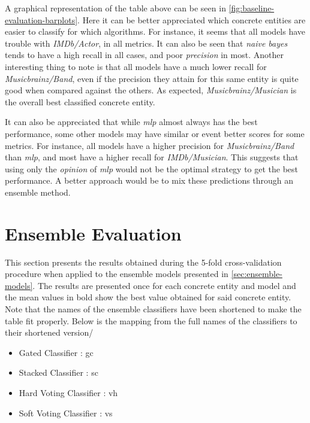 \documentclass[epsfig,a4paper,11pt,titlepage,twoside,openany]{book}
\begin{document}
A graphical representation of the table above can be seen in \autoref{fig:baseline-evaluation-barplots}. Here it can be better appreciated which concrete entities are easier to classify for which algorithms. For instance, it seems that all models have trouble with \textit{IMDb/Actor}, in all metrics. It can also be seen that \textit{naive bayes} tends to have a high recall in all cases, and poor \textit{precision} in most. Another interesting thing to note is that all models have a much lower recall for \textit{Musicbrainz/Band}, even if the precision they attain for this same entity is quite good when compared against the others. As expected, \textit{Musicbrainz/Musician} is the overall best classified concrete entity. 

It can also be appreciated that while \textit{mlp} almost always has the best performance, some other models may have similar or event better scores for some metrics. For instance, all models have a higher precision for \textit{Musicbrainz/Band} than \textit{mlp}, and most have a higher recall for \textit{IMDb/Musician}. This suggests that using only the \textit{opinion} of \textit{mlp} would not be the optimal strategy to get the best performance. A better approach would be to mix these predictions through an ensemble method.



\section{Ensemble Evaluation}
\label{sec:ensemble-evaluation}

This section presents the results obtained during the 5-fold cross-validation procedure when applied to the ensemble models presented in \autoref{sec:ensemble-models}. The results are presented once for each concrete entity and model and the mean values in bold show the best value obtained for said concrete entity. Note that the names of the ensemble classifiers have been shortened to make the table fit properly. Below is the mapping from the full names of the classifiers to their shortened version/ 

\begin{itemize}
    \item Gated Classifier : gc
    \item Stacked Classifier : sc
    \item Hard Voting Classifier : vh
    \item Soft Voting Classifier : vs
\end{itemize}
\end{document}
